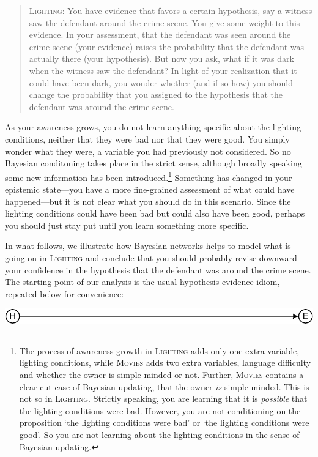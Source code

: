 \documentclass[
  11pt,
  dvipsnames,enabledeprecatedfontcommands]{scrartcl}
\begin{document}
\begin{quote}
\textsc{Lighting:} You have evidence that favors a certain hypothesis, say a witness 
saw the defendant around the crime scene. You give some weight to this evidence. 
In your assessment, that the defendant was seen around the crime scene (your evidence) raises the probability that the defendant was actually there (your hypothesis). But now you ask, what if it was dark when the witness saw the defendant? In light of your realization that it could have been dark, you wonder whether (and if so how) you should change the probability that you assigned to the hypothesis that the defendant was around the crime scene.
\end{quote}

As your awareness grows, you do not learn anything specific about the
lighting conditions, neither that they were bad nor that they were good.
You simply wonder what they were, a variable you had previously not
considered. So no Bayesian conditoning takes place in the strict sense,
although broadly speaking some new information has been
introduced.\footnote{The process of awareness growth in
  \textsc{Lighting} adds only one extra variable, lighting conditions,
  while \textsc{Movies} adds two extra variables, language difficulty
  and whether the owner is simple-minded or not. Further,
  \textsc{Movies} contains a clear-cut case of Bayesian updating, that
  the owner \emph{is} simple-minded. This is not so in
  \textsc{Lighting}. Strictly speaking, you are learning that it is
  \emph{possible} that the lighting conditions were bad. However, you
  are not conditioning on the proposition `the lighting conditions were
  bad' or `the lighting conditions were good'. So you are not learning
  about the lighting conditions in the sense of Bayesian updating.}
Something has changed in your epistemic state---you have a more
fine-grained assessment of what could have happened---but it is not
clear what you should do in this scenario. Since the lighting conditions
could have been bad but could also have been good, perhaps you should
just stay put until you learn something more specific.

In what follows, we illustrate how Bayesian networks helps to model what
is going on in \textsc{Lighting} and conclude that you should probably
revise downward your confidence in the hypothesis that the defendant was
around the crime scene. The starting point of our analysis is the usual
hypothesis-evidence idiom, repeated below for convenience:

\begin{center}\includegraphics[width=0.5\linewidth,height=0.5\textheight]{ReplyToSteeleStefansson5_files/figure-latex/heDAG-1} \end{center}
\end{document}
